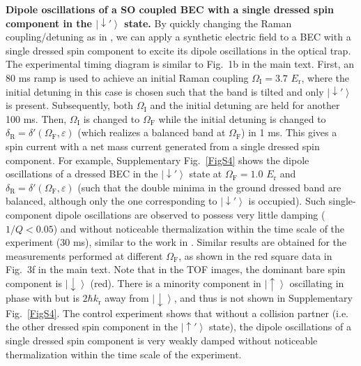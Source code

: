 \documentclass[showpacs,preprintnumbers,amsmath,amssymb, superscriptaddress, aps, reprint]{revtex4-1}
\def\E_r{E_{\text{r}}}
\def\k_r{k_{\text{r}}}
\def\deltaR{\delta_{\text{R}}}
\def\OmegaF{\Omega_{\text{F}}}
\def\OmegaI{\Omega_{\text{I}}}
\begin{document}
{{\vspace{5mm}
\noindent
\textbf{Dipole oscillations of a SO coupled BEC with a single dressed spin component in the $\left| { \downarrow '} \right\rangle$ state.} By quickly changing the Raman coupling/detuning as in \cite{zhang_dipole_PRL_2012}, we can apply a synthetic electric field to a BEC with a single dressed spin component to excite its dipole oscillations in the optical trap. 
{The experimental timing diagram is similar to Fig.~1b in the main text. First, an 80 ms ramp is used to achieve an initial Raman coupling $\OmegaI = 3.7$ $\E_r$, where the initial detuning in this case is chosen such that the band is tilted and only $\left| { \downarrow '} \right\rangle$ is present. 
Subsequently, both $\OmegaI$ and the initial detuning are held for another 100 ms. Then, $\OmegaI$ is changed to $\OmegaF$ while the initial detuning is changed to ${\deltaR} = \delta '(\OmegaF ,\varepsilon )$ (which realizes a balanced band at $\OmegaF$) in 1 ms.} 
This gives a spin current with a net mass current generated from a single dressed spin component. For example, Supplementary Fig.~\ref{FigS4} shows the dipole oscillations of a dressed BEC in the $\left| { \downarrow '} \right\rangle$ state at $\OmegaF = 1.0$ $\E_r$ and ${\deltaR} = \delta '(\OmegaF ,\varepsilon )$ (such that the double minima in the ground dressed band are balanced, although only the one corresponding to $\left| { \downarrow '} \right\rangle$ is occupied). Such single-component dipole oscillations are observed to possess very little damping ($1/Q < 0.05$) and without noticeable thermalization within the time scale of the experiment ($30$ ms), similar to the work in \cite{zhang_dipole_PRL_2012}. Similar results are obtained for the measurements performed at different $\OmegaF$, as shown in the red square data in Fig.~3f in the main text. Note that in the TOF images, the dominant bare spin component is $\left| { \downarrow} \right\rangle$ (red). There is a minority component in $\left| { \uparrow} \right\rangle$ oscillating in phase with but is $2\hbar \k_r$ away from $\left| { \downarrow} \right\rangle$, and thus is not shown in Supplementary Fig.~\ref{FigS4}. The control experiment shows that without a collision partner (i.e. the other dressed spin component in the $\left| { \uparrow '} \right\rangle$ state), the dipole oscillations of a single dressed spin component is very weakly damped without noticeable thermalization within the time scale of the experiment.

}}
\end{document}
